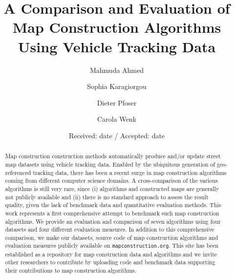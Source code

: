 \documentclass[natbib]{svjour3}                    \smartqed  \usepackage[table]{xcolor}
\begin{document}
\title{A Comparison and Evaluation of Map Construction Algorithms Using Vehicle Tracking Data}

\author{Mahmuda Ahmed         \and
        Sophia Karagiorgou    \and
        Dieter Pfoser		  \and
        Carola Wenk
}


\date{Received: date / Accepted: date}



\maketitle

\begin{abstract}
Map construction construction methods automatically produce and/or update street map datasets using vehicle tracking data. Enabled by the ubiquitous generation of geo-referenced tracking data, there has been a recent surge in map construction algorithms coming from different computer science domains. A cross-comparison of the various algorithms is still very rare, since (i) algorithms and constructed maps are generally not publicly available and (ii) there is no standard approach to assess the result quality, given the lack of benchmark data and quantitative evaluation methods.
This work represents a first comprehensive attempt to benchmark such map construction algorithms. We provide an evaluation and comparison of seven algorithms using four datasets and four different evaluation measures. 
In addition to this comprehensive comparison, we make our datasets, source code of map construction algorithms and evaluation measures publicly available on {\tt mapconstruction.org}. This site has been established as a repository for map construction data and algorithms and we invite other researchers to contribute by uploading code and benchmark data supporting their contributions to map construction algorithms. 








\end{abstract} 
\end{document}
